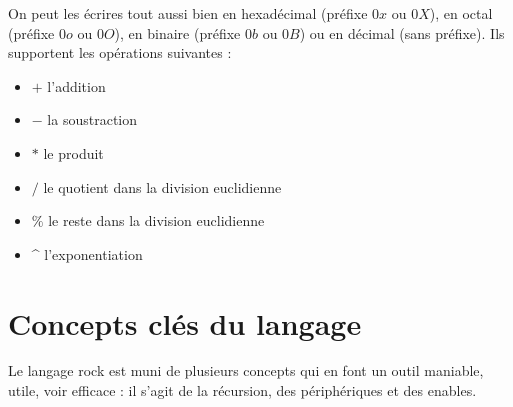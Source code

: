 \documentclass[13pt]{article}
\begin{document}
On peut les écrires tout aussi bien en hexadécimal (préfixe \og $0x$\fg{} ou \og $0X$\fg{}), en
octal (préfixe \og $0o$\fg{} ou \og $0O$\fg{}), en binaire (préfixe \og $0b$ \og
ou \og $0B$\fg{}) ou en décimal (sans préfixe).
Ils supportent les opérations suivantes :
\begin{itemize}
\item $+$ l'addition
\item $-$ la soustraction
\item $*$ le produit
\item $/$ le quotient dans la division euclidienne
\item $\%$ le reste dans la division euclidienne
\item \^{} l'exponentiation
\end{itemize}


\section{Concepts clés du langage}

Le langage rock est muni de plusieurs concepts qui en font un outil maniable,
utile, voir efficace : il s'agit de la récursion, des périphériques et des enables.
\end{document}
